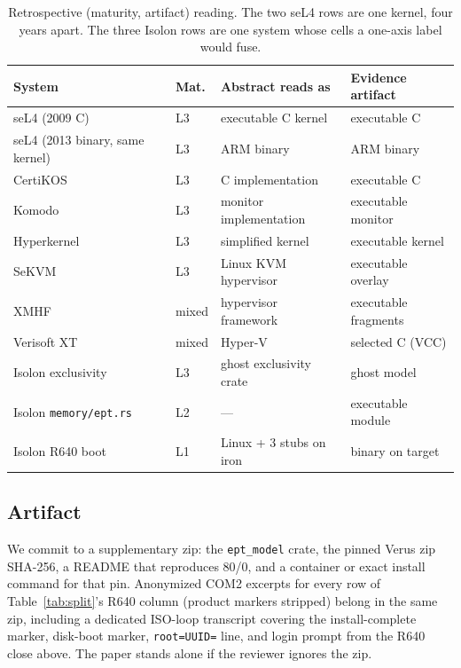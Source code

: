 \documentclass[sigplan,10pt,anonymous]{acmart}
\begin{document}
\begin{table}[t]
  \caption{Retrospective (maturity, artifact) reading. The two seL4 rows
  are one kernel, four years apart. The three Isolon rows are one system
  whose cells a one-axis label would fuse.}
  \label{tab:ladder}
  \small
  \begin{tabularx}{\textwidth}{@{}l l L L@{}}
    \toprule
    System & Mat. & Abstract reads as & Evidence artifact \\
    \midrule
    seL4 (2009 C)~\cite{klein2009sel4} & L3 & executable C kernel & executable C \\
    seL4 (2013 binary, same kernel)~\cite{sewell2013translation} & L3 & ARM binary & ARM binary \\
    \midrule
    CertiKOS~\cite{gu2016certikos} & L3 & C implementation & executable C \\
    Komodo~\cite{ferraiuolo2017komodo} & L3 & monitor implementation & executable monitor \\
    Hyperkernel~\cite{nelson2017hyperkernel} & L3 & simplified kernel & executable kernel \\
    SeKVM~\cite{li2021varmour} & L3 & Linux KVM hypervisor & executable overlay \\
    XMHF~\cite{vasudevan2013xmhf} & mixed & hypervisor framework & executable fragments \\
    Verisoft XT~\cite{leinenbach2009verisoft} & mixed & Hyper-V & selected C (VCC) \\
    \midrule
    Isolon exclusivity & L3 & ghost exclusivity crate & ghost model \\
    Isolon \texttt{memory/ept.rs} & L2 & --- & executable module \\
    Isolon R640 boot & L1 & Linux + 3 stubs on iron & binary on target \\
    \bottomrule
  \end{tabularx}
\end{table}

\subsection{Artifact}

We commit to a supplementary zip: the \texttt{ept\_model} crate, the
pinned Verus zip SHA-256, a README that reproduces 80/0, and a container
or exact install command for that pin. Anonymized COM2 excerpts for every
row of Table~\ref{tab:split}'s R640 column (product markers stripped) belong
in the same zip, including a dedicated ISO-loop transcript covering the
install-complete marker, disk-boot marker, \texttt{root=UUID=} line, and
login prompt from the R640 close above. The paper stands alone if the
reviewer ignores the zip.
\end{document}
